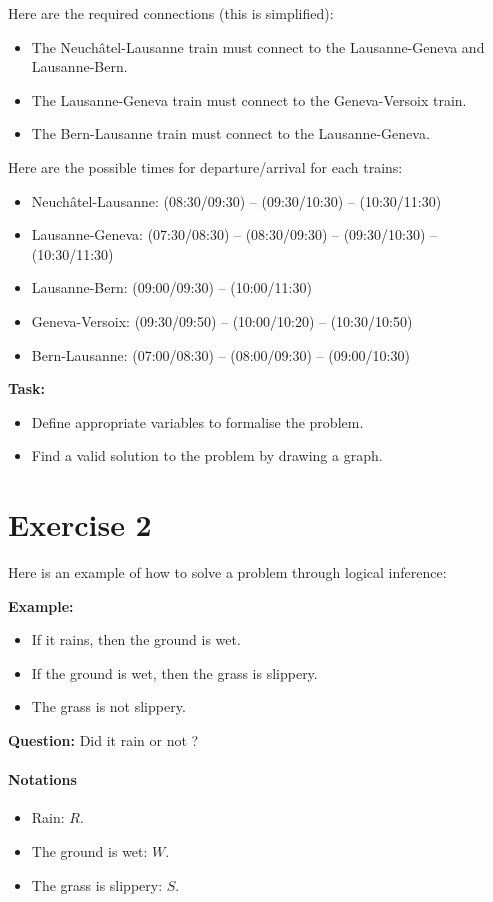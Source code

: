 \documentclass[11pt]{article}
\numberwithin{equation}{section}
\begin{document}
Here are the required connections (this is simplified):
\begin{itemize}
    \item The Neuchâtel-Lausanne train must connect to the Lausanne-Geneva and Lausanne-Bern.
    \item The Lausanne-Geneva train must connect to the Geneva-Versoix train.
    \item The Bern-Lausanne train must connect to the Lausanne-Geneva.
\end{itemize}

Here are the possible times for departure/arrival for each trains:
\begin{itemize}
    \item Neuchâtel-Lausanne: (08:30/09:30) -- (09:30/10:30) -- (10:30/11:30)
    \item Lausanne-Geneva: (07:30/08:30) -- (08:30/09:30) -- (09:30/10:30) -- (10:30/11:30)
    \item Lausanne-Bern: (09:00/09:30) -- (10:00/11:30)
    \item Geneva-Versoix: (09:30/09:50) -- (10:00/10:20) -- (10:30/10:50)
    \item Bern-Lausanne: (07:00/08:30) -- (08:00/09:30) -- (09:00/10:30)
\end{itemize}

\textbf{Task:}
\begin{itemize}
    \item Define appropriate variables to formalise the problem.
    \item Find a valid solution to the problem by drawing a graph.
\end{itemize}

\section*{Exercise 2}

Here is an example of how to solve a problem through logical inference:

\smallskip
\textbf{Example:} 
\begin{itemize}
    \item If it rains, then the ground is wet.
    \item If the ground is wet, then the grass is slippery.
    \item The grass is not slippery.
\end{itemize}
\textbf{Question:}  Did it rain or not ?

\paragraph{Notations}
\begin{itemize}
    \item Rain: $R$.
    \item The ground is wet: $W$.
    \item The grass is slippery: $S$.
\end{itemize}
\end{document}
